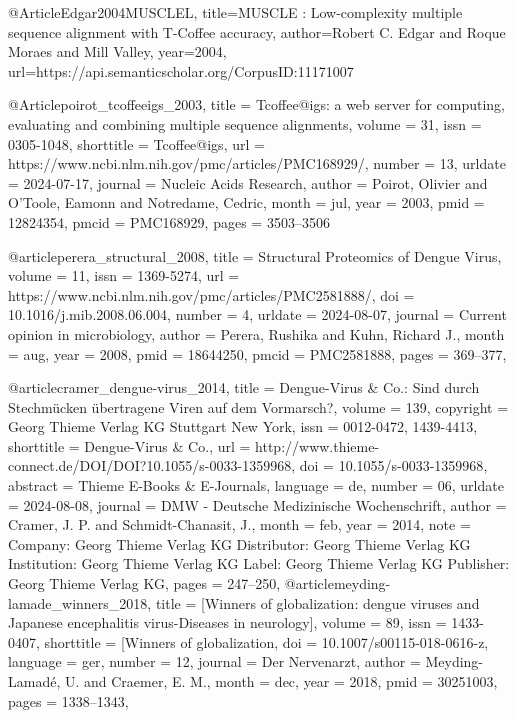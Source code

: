 \documentclass[german,version-2022-01]{uzl-thesis}
\begin{document}
\begin{bibtex-entries}

@Article{Edgar2004MUSCLEL,
  title={MUSCLE : Low-complexity multiple sequence alignment with T-Coffee accuracy},
  author={Robert C. Edgar and Roque Moraes and Mill Valley},
  year={2004},
  url={https://api.semanticscholar.org/CorpusID:11171007}
}

@Article{poirot_tcoffeeigs_2003,
	title = {Tcoffee@igs: a web server for computing, evaluating and combining multiple sequence alignments},
	volume = {31},
	issn = {0305-1048},
	shorttitle = {Tcoffee@igs},
	url = {https://www.ncbi.nlm.nih.gov/pmc/articles/PMC168929/},
	number = {13},
	urldate = {2024-07-17},
	journal = {Nucleic Acids Research},
	author = {Poirot, Olivier and O'Toole, Eamonn and Notredame, Cedric},
	month = jul,
	year = {2003},
	pmid = {12824354},
	pmcid = {PMC168929},
	pages = {3503--3506}
}

@article{perera_structural_2008,
	title = {Structural {Proteomics} of {Dengue} {Virus}},
	volume = {11},
	issn = {1369-5274},
	url = {https://www.ncbi.nlm.nih.gov/pmc/articles/PMC2581888/},
	doi = {10.1016/j.mib.2008.06.004},
	number = {4},
	urldate = {2024-08-07},
	journal = {Current opinion in microbiology},
	author = {Perera, Rushika and Kuhn, Richard J.},
	month = aug,
	year = {2008},
	pmid = {18644250},
	pmcid = {PMC2581888},
	pages = {369--377},
}

@article{cramer_dengue-virus_2014,
	title = {Dengue-{Virus} \& {Co}.: {Sind} durch {Stechm\"ucken} \"ubertragene {Viren} auf dem {Vormarsch}?},
	volume = {139},
	copyright = {\textcopyright Georg Thieme Verlag KG Stuttgart \cdot New York},
	issn = {0012-0472, 1439-4413},
	shorttitle = {Dengue-{Virus} \& {Co}.},
	url = {http://www.thieme-connect.de/DOI/DOI?10.1055/s-0033-1359968},
	doi = {10.1055/s-0033-1359968},
	abstract = {Thieme E-Books \& E-Journals},
	language = {de},
	number = {06},
	urldate = {2024-08-08},
	journal = {DMW - Deutsche Medizinische Wochenschrift},
	author = {Cramer, J. P. and Schmidt-Chanasit, J.},
	month = feb,
	year = {2014},
	note = {Company: \textcopyright Georg Thieme Verlag KG
Distributor: \textcopyright Georg Thieme Verlag KG
Institution: \textcopyright Georg Thieme Verlag KG
Label: \textcopyright Georg Thieme Verlag KG
Publisher: \textcopyright Georg Thieme Verlag KG},
	pages = {247--250},
}
@article{meyding-lamade_winners_2018,
	title = {[{Winners} of globalization: dengue viruses and {Japanese} encephalitis virus-{Diseases} in neurology]},
	volume = {89},
	issn = {1433-0407},
	shorttitle = {[{Winners} of globalization},
	doi = {10.1007/s00115-018-0616-z},
	language = {ger},
	number = {12},
	journal = {Der Nervenarzt},
	author = {Meyding-Lamad\'e, U. and Craemer, E. M.},
	month = dec,
	year = {2018},
	pmid = {30251003},
	pages = {1338--1343},
}


\end{bibtex-entries}
\end{document}
